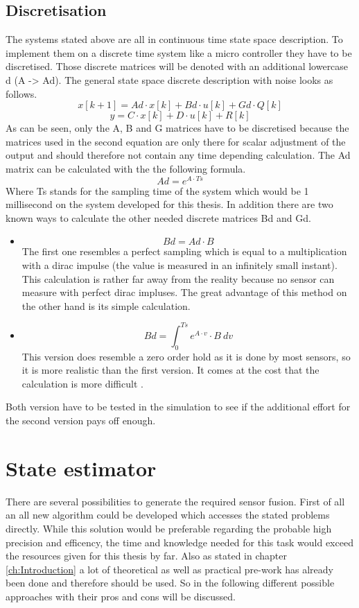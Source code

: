   \subsection{Discretisation}
  The systems stated above are all in continuous time state space description.
  To implement them on a discrete time system like a micro controller they have to be discretised.
  Those discrete matrices will be denoted with an additional lowercase d (A -> Ad).
  The general state space discrete description with noise looks as follows.
  $$ x[k+1] = Ad\cdot x[k] + Bd\cdot u[k] + Gd\cdot Q[k] $$
  $$ y = C \cdot x[k] + D\cdot u[k] + R[k] $$
  As can be seen, only the A, B and G matrices have to be discretised because
  the matrices used in the second equation are only there for scalar adjustment of the output
  and should therefore not contain any time depending calculation.
  The Ad matrix can be calculated with the the following formula.
  $$ Ad = e^{A\cdot Ts}$$
  Where Ts stands for the sampling time of the system which would be 1 millisecond on the system developed for this thesis.
  In addition there are two known ways to calculate the other needed discrete matrices Bd and Gd.
  \begin{itemize}
   \item $$ Bd = Ad \cdot B $$
	 The first one resembles a perfect sampling which is equal to a multiplication with a dirac impulse (the value is measured in an infinitely small instant).
	 This calculation is rather far away from the reality because no sensor can measure with perfect dirac impluses.
	 The great advantage of this method on the other hand is its simple calculation.
   \item $$ Bd = \int_0^{Ts} e^{A\cdot v}\cdot B \ dv $$
	 This version does resemble a zero order hold as it is done by most sensors, so it is more realistic than the first version.
	 It comes at the cost that the calculation is more difficult \cite{DavidWSchultz2004}.
  \end{itemize}

  Both version have to be tested in the simulation to see if the additional effort for the second version pays off enough.

  \section{State estimator}
  There are several possibilities to generate the required sensor fusion. First of all an all new algorithm could be developed which accesses the
  stated problems directly. While this solution would be preferable regarding the probable high precision and efficency, the
  time and knowledge needed for this task would exceed the resources given for this thesis by far.
  Also as stated in chapter \ref{ch:Introduction} a lot of theoretical as well as practical pre-work has already been
  done and therefore should be used.
  So in the following different possible approaches with their pros and cons will be discussed.

